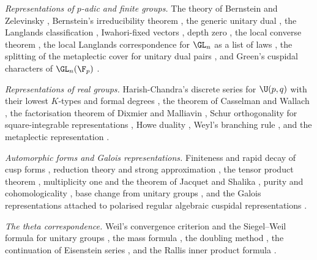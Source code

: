 \emph{Representations of $p$-adic and finite groups.} The theory of Bernstein and Zelevinsky
\cite{bernstein1976representations,bernstein1977induced,zelevinsky1980induced}, Bernstein's
irreducibility theorem \cite{bernstein1984pinvariant}, the generic unitary dual
\cite{tadic1986classification}, the Langlands classification \cite{silberger1978langlands},
Iwahori-fixed vectors \cite{borel1976admissible,casselman1980unramified}, depth zero
\cite{moy1994unrefined,moy1996jacquet}, the local converse theorem
\cite{henniart1993caracterisation}, the local Langlands correspondence for $\GL_n$ as a list of
laws \cite{harris2001geometry,henniart2000preuve,scholze2013local}, the splitting of the
metaplectic cover for unitary dual pairs \cite{kudla1994splitting}, and Green's cuspidal
characters of $\GL_n(\F_p)$ \cite{green1955characters,gelfand1970representations}.

\emph{Representations of real groups.} Harish-Chandra's discrete series for $\U(p,q)$ with
their lowest $K$-types and formal degrees
\cite{harishchandra1965discrete,harishchandra1966discrete,schmid1975some}, the theorem of
Casselman and Wallach \cite{casselman1989canonical,wallach1983asymptotic}, the factorisation
theorem of Dixmier and Malliavin \cite{dixmier1978factorisations}, Schur orthogonality for
square-integrable representations \cite{godement1947orthogonalite}, Howe duality
\cite{howe1989remarks,howe1989transcending}, Weyl's branching rule \cite{weyl1946classical},
and the metaplectic representation \cite{weil1964certains,shale1962linear}.

\emph{Automorphic forms and Galois representations.} Finiteness and rapid decay of cusp forms
\cite{harishchandra1968automorphic,gelfand1969representation,moeglin1994decomposition},
reduction theory and strong approximation
\cite{borel1962arithmetic,kneser1965starke,platonov1969problem}, the tensor product theorem
\cite{flath1979decomposition}, multiplicity one and the theorem of Jacquet and Shalika
\cite{shalika1974multiplicity,piatetskishapiro1979multiplicity,jacquet1981eulerI,jacquet1981eulerII},
purity and cohomologicality \cite{clozel1990motifs}, base change from unitary groups
\cite{labesse2011changement}, and the Galois representations attached to polarised regular
algebraic cuspidal representations
\cite{shin2011galois,chenevier2013construction,caraiani2012local}.

\emph{The theta correspondence.} Weil's convergence criterion and the Siegel--Weil formula for
unitary groups \cite{weil1965formule,ichino2007siegel,yamana2011siegel,ikeda1996residue}, the
mass formula \cite{siegel1935analytische,braun1941theorie}, the doubling method
\cite{piatetskishapiro1987lfunctions,gelbart1987explicit}, the continuation of Eisenstein
series \cite{langlands1976functional,bernstein2024meromorphic}, and the Rallis inner product
formula \cite{rallis1984injectivity,li1992nonvanishing}.

